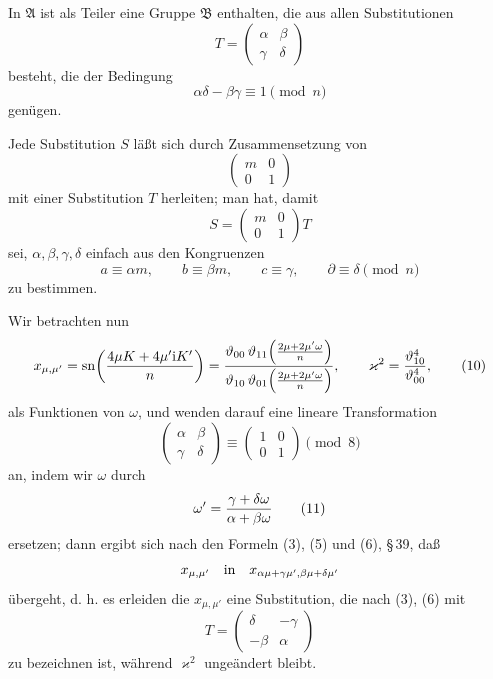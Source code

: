 \documentclass[11pt]{article}
\providecommand{\ii}{\mathrm{i}}
\providecommand{\sn}{\operatorname{sn}}
\begin{document}
In $\mathfrak A$ ist als Teiler eine Gruppe $\mathfrak B$ enthalten, die aus allen Substitutionen
\begin{equation}
 T=\begin{pmatrix}\alpha&\beta\\ \gamma&\delta\end{pmatrix}
\tag{8}
\end{equation}
besteht, die der Bedingung
\begin{equation}
 \alpha\delta-\beta\gamma\equiv1\pmod n
\tag{9}
\end{equation}
genügen.

Jede Substitution $S$ läßt sich durch Zusammensetzung von
\[
 \begin{pmatrix}m&0\\0&1\end{pmatrix}
\]
mit einer Substitution $T$ herleiten; man hat, damit
\[
 S=\begin{pmatrix}m&0\\0&1\end{pmatrix}T
\]
sei, $\alpha,\beta,\gamma,\delta$ einfach aus den Kongruenzen
\[
 a\equiv\alpha m,
 \qquad b\equiv\beta m,
 \qquad c\equiv\gamma,
 \qquad \partial\equiv\delta\pmod n
\]
zu bestimmen.

Wir betrachten nun
\begin{equation}
 x_{\mu,\mu'}=
 \sn\!\left({4\mu K+4\mu'\ii K'\over n}\right)
 ={\vartheta_{00}\,\vartheta_{11}\!\left({2\mu+2\mu'\omega\over n}\right)
 \over
 \vartheta_{10}\,\vartheta_{01}\!\left({2\mu+2\mu'\omega\over n}\right)},
 \qquad
 \varkappa^2={\vartheta_{10}^{4}\over\vartheta_{00}^{4}},
\tag{10}
\end{equation}
als Funktionen von $\omega$, und wenden darauf eine lineare Transformation
\[
 \begin{pmatrix}\alpha&\beta\\ \gamma&\delta\end{pmatrix}
 \equiv
 \begin{pmatrix}1&0\\0&1\end{pmatrix}\pmod 8
\]
an, indem wir $\omega$ durch
\begin{equation}
 \omega'={\gamma+\delta\omega\over\alpha+\beta\omega}
\tag{11}
\end{equation}
ersetzen; dann ergibt sich nach den Formeln (3), (5) und (6), \S\,39, daß
\[
 x_{\mu,\mu'}\quad\hbox{in}\quad x_{\alpha\mu+\gamma\mu',\beta\mu+\delta\mu'}
\]
übergeht, d. h. es erleiden die $x_{\mu,\mu'}$ eine Substitution, die nach (3), (6) mit
\[
 T=\begin{pmatrix}\delta&-\gamma\\ -\beta&\alpha\end{pmatrix}
\]
zu bezeichnen ist, während $\varkappa^2$ ungeändert bleibt.
\end{document}
